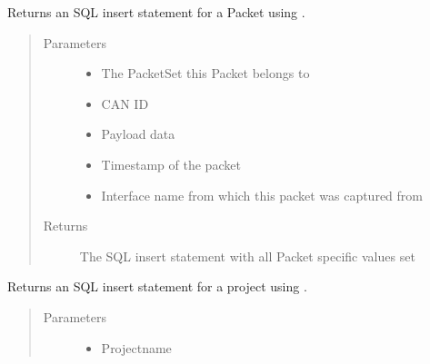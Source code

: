\documentclass[letterpaper,10pt,english]{sphinxmanual}
\begin{document}
\begin{fulllineitems}
\begin{fulllineitems}
\label{\detokenize{src:src.Database.DatabaseStatements.getInsertPacketStatement}}
Returns an SQL insert statement for a Packet using {\hyperref[\detokenize{src:src.Database.DatabaseStatements.getInsertStatement}]{}}.
\begin{quote}\begin{description}
\item[{Parameters}] \leavevmode\begin{itemize}
\item {} 
 \textendash{} The PacketSet this Packet belongs to

\item {} 
 \textendash{} CAN ID

\item {} 
 \textendash{} Payload data

\item {} 
 \textendash{} Timestamp of the packet

\item {} 
 \textendash{} Interface name from which this packet was captured from

\end{itemize}

\item[{Returns}] \leavevmode
The SQL insert statement with all Packet specific values set

\end{description}\end{quote}

\end{fulllineitems}


\begin{fulllineitems}
\label{\detokenize{src:src.Database.DatabaseStatements.getInsertProjectStatement}}
Returns an SQL insert statement for a project using {\hyperref[\detokenize{src:src.Database.DatabaseStatements.getInsertStatement}]{}}.
\begin{quote}\begin{description}
\item[{Parameters}] \leavevmode\begin{itemize}
\item {} 
 \textendash{} Projectname


\end{itemize}
\end{description}
\end{quote}
\end{fulllineitems}
\end{fulllineitems}
\end{document}
